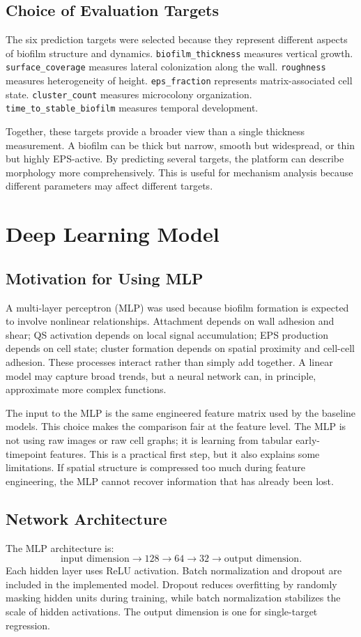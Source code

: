 \documentclass[12pt,a4paper,oneside]{report}
\begin{document}
\section{Choice of Evaluation Targets}
The six prediction targets were selected because they represent different aspects of biofilm structure and dynamics. \texttt{biofilm\_thickness} measures vertical growth. \texttt{surface\_coverage} measures lateral colonization along the wall. \texttt{roughness} measures heterogeneity of height. \texttt{eps\_fraction} represents matrix-associated cell state. \texttt{cluster\_count} measures microcolony organization. \texttt{time\_to\_stable\_biofilm} measures temporal development.

Together, these targets provide a broader view than a single thickness measurement. A biofilm can be thick but narrow, smooth but widespread, or thin but highly EPS-active. By predicting several targets, the platform can describe morphology more comprehensively. This is useful for mechanism analysis because different parameters may affect different targets.

\chapter{Deep Learning Model}

\section{Motivation for Using MLP}
A multi-layer perceptron (MLP) was used because biofilm formation is expected to involve nonlinear relationships. Attachment depends on wall adhesion and shear; QS activation depends on local signal accumulation; EPS production depends on cell state; cluster formation depends on spatial proximity and cell-cell adhesion. These processes interact rather than simply add together. A linear model may capture broad trends, but a neural network can, in principle, approximate more complex functions.

The input to the MLP is the same engineered feature matrix used by the baseline models. This choice makes the comparison fair at the feature level. The MLP is not using raw images or raw cell graphs; it is learning from tabular early-timepoint features. This is a practical first step, but it also explains some limitations. If spatial structure is compressed too much during feature engineering, the MLP cannot recover information that has already been lost.

\section{Network Architecture}
The MLP architecture is:
\begin{equation}
\text{input dimension} \rightarrow 128 \rightarrow 64 \rightarrow 32 \rightarrow \text{output dimension}.
\end{equation}
Each hidden layer uses ReLU activation. Batch normalization and dropout are included in the implemented model. Dropout reduces overfitting by randomly masking hidden units during training, while batch normalization stabilizes the scale of hidden activations. The output dimension is one for single-target regression.
\end{document}
